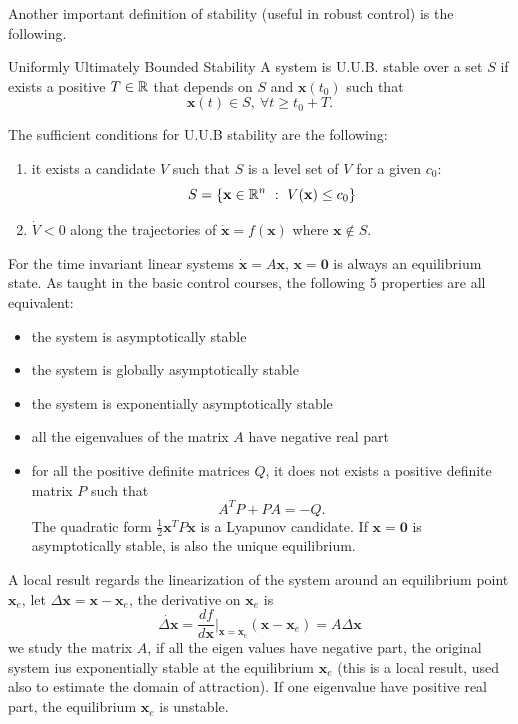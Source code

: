 \documentclass[10pt, a4paper]{report}
\begin{document}
Another important definition of stability (useful in robust control) is the following.\begin{boxdefinition}{Uniformly Ultimately Bounded Stability}{}
    A system is U.U.B. stable over a set $S$ if exists a positive $T\in {\mathbb R}$ that depends on $S$ and $\mathbf x(t_0)$ such that\begin{equation}
        \mathbf x(t)\in S, \ \forall t\ge t_0+T.
    \end{equation}
\end{boxdefinition}
The sufficient conditions for U.U.B stability are the following:\begin{enumerate}
    \item it exists a candidate $V$ such that $S$ is a level set of $V$ for a given $c_0$:\begin{equation}
        S=\{\mathbf x\in {\mathbb R}^n \ : \ V(\mathbf x)\le c_0\}
    \end{equation}
    \item $\dot V<0$ along the trajectories of $\dot {\mathbf x}=f(\mathbf x)$ where $\mathbf x \notin S$.
\end{enumerate}
For the time invariant linear systems $\dot{\mathbf x}=A\mathbf x$, $\mathbf x=\mathbf 0$ is always an equilibrium state. As taught in the basic control courses, the following 5  properties are all equivalent:\begin{itemize}
    \item the system is asymptotically stable 
    \item the system is globally asymptotically stable 
    \item the system is exponentially asymptotically stable 
    \item all the eigenvalues of the matrix $A$ have negative real part 
    \item for all the positive definite matrices $Q$, it does not exists a positive definite matrix $P$ such that\begin{equation}
        A^TP+PA=-Q. 
    \end{equation}
    The quadratic form $\frac{1}{2}\mathbf x^TP\mathbf x$ is a Lyapunov candidate. If $\mathbf x=\mathbf 0$ is asymptotically stable, is also the unique equilibrium.
\end{itemize}
A local result regards the linearization of the system around an equilibrium point $\mathbf x_e$, let $\Delta\mathbf x=\mathbf x-\mathbf x_e$, the derivative on $\mathbf x_e$ is\begin{equation}
    \dot{\Delta\mathbf x}=\frac{df}{d\mathbf x}\Big |_{\mathbf x=\mathbf x_e}(\mathbf x-\mathbf x_e)=A\Delta\mathbf x 
\end{equation}
we study the matrix $A$, if all the eigen values have negative part, the original system ius exponentially stable at the equilibrium $\mathbf x_e$ (this is a local result, used also to estimate the domain of attraction). If one eigenvalue have positive real part, the equilibrium $\mathbf x_e$ is unstable.
\end{document}
